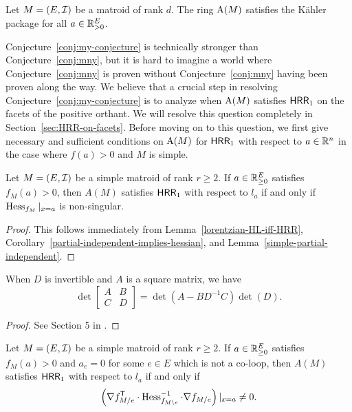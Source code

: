 \documentclass{puthesis-UG}
\begin{document}
\begin{conj} \label{conj:my-conjecture}
	Let $M = (E, \mathcal{I})$ be a matroid of rank $d$. The ring $\operatorname{A}(M)$ satisfies the K\"ahler package for all $a \in \mathbb{R}^E_{> 0}$.
\end{conj}

Conjecture~\ref{conj:my-conjecture} is technically stronger than Conjecture~\ref{conj:mny}, but it is hard to imagine a world where Conjecture~\ref{conj:mny} is proven without Conjecture~\ref{conj:mny} having been proven along the way. We believe that a crucial step in resolving Conjecture~\ref{conj:my-conjecture} is to analyze when $\operatorname{A}(M)$ satisfies $\mathsf{HRR}_1$ on the facets of the positive orthant. We will resolve this question completely in Section~\ref{sec:HRR-on-facets}. Before moving on to this question, we first give necessary and sufficient conditions on $\operatorname{A}(M)$ for $\mathsf{HRR}_1$ with respect to $a \in \mathbb{R}^n$ in the case where $f(a) > 0$ and $M$ is simple.

\begin{cor} \label{simple-matroids-HRR-condition}
	Let $M = (E, \mathcal{I})$ be a simple matroid of rank $r \geq 2$. If $a \in \mathbb{R}_{\geq 0}^E$ satisfies $f_M(a) > 0$, then $A(M)$ satisfies $\mathsf{HRR}_1$ with respect to $l_a$ if and only if $\operatorname{Hess}_{f_M} |_{x = a}$ is non-singular.
\end{cor} 

\begin{proof}
	This follows immediately from Lemma~\ref{lorentzian-HL-iff-HRR}, Corollary~\ref{partial-independent-implies-hessian}, and Lemma~\ref{simple-partial-independent}.
\end{proof}

\begin{lem} \label{block-matrix-determinant-calculation}
		When $D$ is invertible and $A$ is a square matrix, we have
		\[
			\det \begin{bmatrix} A & B \\ C & D \end{bmatrix} = \det (A - B D^{-1} C) \det (D).
		\]
	\end{lem}
	\begin{proof}
		See Section 5 in \cite{block-matrices}.
	\end{proof}

\begin{thm} \label{thm:simple-inverse-hessian-property}
	Let $M = (E, \mathcal{I})$ be a simple matroid of rank $r \geq 2$. If $a \in \mathbb{R}_{\geq 0}^E$ satisfies $f_M(a) > 0$ and $a_e = 0$ for some $e \in E$ which is not a co-loop, then $A(M)$ satisfies $\mathsf{HRR}_1$ with respect to $l_a$ if and only if 
	\[
		\left ( \nabla f_{M / e}^{\mathsf{T}} \cdot \operatorname{Hess}^{-1}_{f_{M \backslash e}} \cdot \nabla f_{M / e} \right ) |_{x = a} \neq 0.
	\]
\end{thm}
\end{document}
